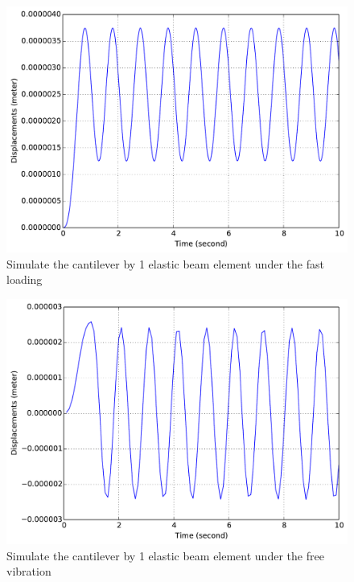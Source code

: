\begin{figure}[!htb]
  \centering
  \includegraphics[width=12cm]{./Figure-files/_Chapter_Appendix_Illustrative_Examples/beam-1element-fastLoading.pdf}
  \caption{Simulate the cantilever by 1 elastic beam element under the fast loading}
  \label{fig_beam1_fast}
\end{figure}

\begin{figure}[!htb]
  \centering
  \includegraphics[width=12cm]{./Figure-files/_Chapter_Appendix_Illustrative_Examples/beam-1element-freeVibration.pdf}
  \caption{Simulate the cantilever by 1 elastic beam element under the free vibration}
  \label{fig_beam1_freevib}
\end{figure}

























